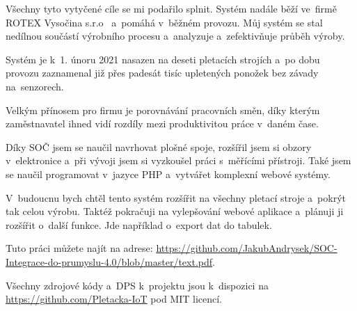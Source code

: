 \documentclass{template/socthesis}
\begin{document}
Všechny tyto vytyčené cíle se mi podařilo splnit. Systém nadále běží ve~firmě ROTEX Vysočina s.r.o~\cite{ROTEX} a~pomáhá v~běžném provozu.
Můj systém se stal nedílnou součástí výrobního procesu a analyzuje a~zefektivňuje průběh výroby.

Systém je k 1. únoru 2021 nasazen na deseti pletacích strojích a po dobu provozu zaznamenal již přes padesát tisíc upletených ponožek bez závady na~senzorech.

Velkým přínosem pro firmu je porovnávání pracovních směn, díky kterým zaměstnavatel ihned vidí rozdíly mezi produktivitou práce v~daném čase.

Díky SOČ jsem se naučil navrhovat plošné spoje, rozšířil jsem si obzory v~elektronice a~při vývoji jsem si vyzkoušel práci s~měřícími přístroji. 
Také jsem se naučil programovat v~jazyce PHP a~vytvářet komplexní webové systémy.

V~budoucnu bych chtěl tento systém rozšířit na všechny pletací stroje a~pokrýt tak celou výrobu.
Taktéž pokračuji na vylepšování webové aplikace a~plánuji ji rozšířit o~další funkce.
Jde například o~export dat do tabulek.

Tuto práci můžete najít na adrese: \url{https://github.com/JakubAndrysek/SOC-Integrace-do-prumyslu-4.0/blob/master/text.pdf}.

Všechny zdrojové kódy a~DPS k~projektu jsou k~dispozici na \url{https://github.com/Pletacka-IoT} pod MIT licencí.

\newpage


\printbibliography[title=Literatura]



\appendix
\end{document}
